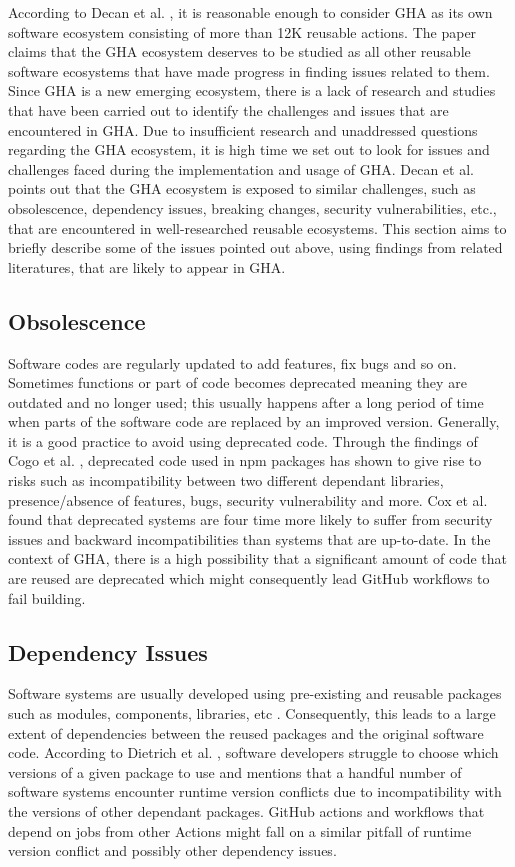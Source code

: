 \documentclass[conference]{IEEEtran}
\begin{document}
According to Decan et al. \cite{b4}, it is reasonable enough to consider GHA as its own software ecosystem consisting of more than 12K reusable actions. The paper claims that the GHA ecosystem deserves to be studied as all other reusable software ecosystems that have made progress in finding issues related to them. Since GHA is a new emerging ecosystem, there is a lack of research and studies that have been carried out to identify the challenges and issues that are encountered in GHA. Due to insufficient research and unaddressed questions regarding the GHA ecosystem, it is high time we set out to look for issues and challenges faced during the implementation and usage of GHA. Decan et al. \cite{b4} points out that the GHA ecosystem is exposed to similar challenges, such as obsolescence, dependency issues, breaking changes, security vulnerabilities, etc., that are encountered in well-researched reusable ecosystems. This section aims to briefly describe some of the issues pointed out above, using findings from related literatures, that are likely to appear in GHA.
\subsection{Obsolescence}

Software codes are regularly updated to add features, fix bugs and so on. Sometimes functions or part of code becomes deprecated meaning they are outdated and no longer used; this usually happens after a long period of time when parts of the software code are replaced by an improved version. Generally, it is a good practice to avoid using deprecated code. Through the findings of Cogo et al. \cite{b6}, deprecated code used in npm packages has shown to give rise to risks such as incompatibility between two different dependant libraries, presence/absence of features, bugs, security vulnerability and more. Cox et al. \cite{b17} found that deprecated systems are four time more likely to suffer from security issues and backward incompatibilities than systems that are up-to-date. In the context of GHA, there is a high possibility that a significant amount of code that are reused are deprecated which might consequently lead GitHub workflows to fail building.
\subsection{Dependency Issues}
Software systems are usually developed using pre-existing and reusable packages such as modules, components, libraries, etc \cite{b7}\cite{b8}. Consequently, this leads to a large extent of dependencies between the reused packages and the original software code. According to Dietrich et al. \cite{b10}, software developers struggle to choose which versions of a given package to use and mentions that a handful number of software systems encounter runtime version conflicts due to incompatibility with the versions of other dependant packages. GitHub actions and workflows that depend on jobs from other Actions might fall on a similar pitfall of runtime version conflict and possibly other dependency issues.
\end{document}
